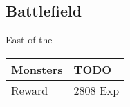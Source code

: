 \subsection{Battlefield}
\label{map:battlefield_19}

East of the 

\noindent\begin{tabularx}{\textwidth}[l]{lX}
	Monsters
	& TODO
\\ \hline
	Reward & 2808 Exp
\end{tabularx}
